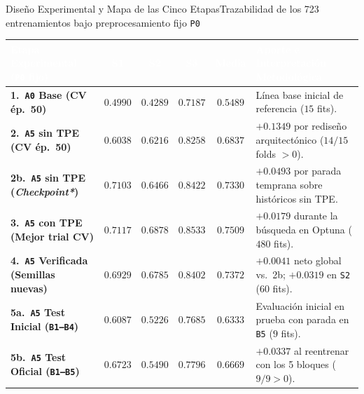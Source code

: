 
\begin{frame}{Dise\~no Experimental y Mapa de las Cinco Etapas}{Trazabilidad de los 723 entrenamientos bajo preprocesamiento fijo \texttt{P0} \cite{rodas_valencia_tpe_ecog}}
  \scriptsize
  \centering
  \renewcommand{\arraystretch}{1.28}
  \setlength{\tabcolsep}{4.5pt}
  \begin{tabularx}{\textwidth}{@{} l c c c c >{\raggedright\arraybackslash}X @{}}
    \toprule
    \rowcolor{ipnDark}
    \textcolor{white}{\textbf{Etapa Experimental (\texttt{P0} fijo)}} &
    \textcolor{white}{\textbf{S1}} &
    \textcolor{white}{\textbf{S2}} &
    \textcolor{white}{\textbf{S3}} &
    \textcolor{white}{\textbf{Media}} &
    \textcolor{white}{\textbf{Aporte e Interpretaci\'on Metodol\'ogica}} \\
    \midrule
    \textbf{1.\ \texttt{A0} Base (CV \'ep.\ 50)} & $0.4990$ & $0.4289$ & $0.7187$ & $\mathbf{0.5489}$ & L\'inea base inicial de referencia ($15$ fits). \\
    \rowcolor{rowLight}
    \textbf{2.\ \texttt{A5} sin TPE (CV \'ep.\ 50)} & $0.6038$ & $0.6216$ & $0.8258$ & $\mathbf{0.6837}$ & $\mathbf{+0.1349}$ por redise\~no arquitect\'onico ($14/15$ folds $>0$). \\
    \textbf{2b.\ \texttt{A5} sin TPE (\textit{Checkpoint*})} & $0.7103$ & $0.6466$ & $0.8422$ & $\mathbf{0.7330}$ & $\mathbf{+0.0493}$ por parada temprana sobre hist\'oricos sin TPE. \\
    \rowcolor{rowLight}
    \textbf{3.\ \texttt{A5} con TPE (Mejor trial CV)} & $0.7117$ & $0.6878$ & $0.8533$ & $\mathbf{0.7509}$ & $\mathbf{+0.0179}$ durante la b\'usqueda en Optuna ($480$ fits). \\
    \textbf{4.\ \texttt{A5} Verificada (Semillas nuevas)} & $0.6929$ & $0.6785$ & $0.8402$ & $\mathbf{0.7372}$ & $\mathbf{+0.0041}$ neto global vs.\ 2b; $\mathbf{+0.0319}$ en \texttt{S2} ($60$ fits). \\
    \midrule
    \rowcolor{rowLight}
    \textbf{5a.\ \texttt{A5} Test Inicial (\texttt{B1--B4})} & $0.6087$ & $0.5226$ & $0.7685$ & $\mathbf{0.6333}$ & Evaluaci\'on inicial en prueba con parada en \texttt{B5} ($9$ fits). \\
    \rowcolor{rowHighlight}
    \textbf{5b.\ \texttt{A5} Test Oficial (\texttt{B1--B5})} & $\mathbf{0.6723}$ & $\mathbf{0.5490}$ & $\mathbf{0.7796}$ & $\mathbf{0.6669}$ & $\mathbf{+0.0337}$ al reentrenar con los 5 bloques ($9/9 > 0$). \\
    \bottomrule
  \end{tabularx}


\end{frame}

